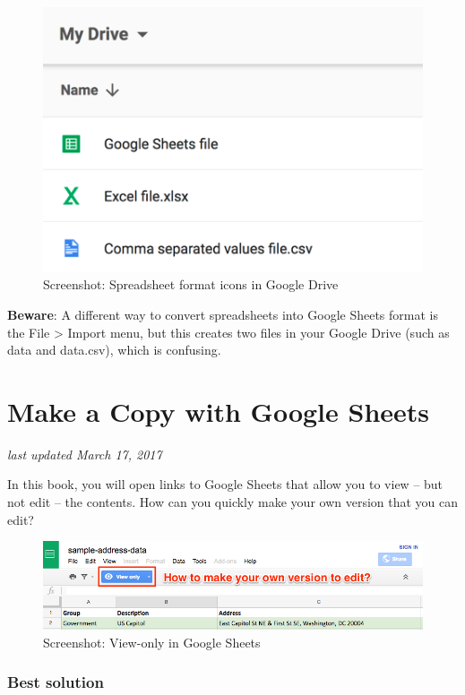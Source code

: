 \documentclass[
  english,
]{book}
\begin{document}
\begin{figure}
\centering
\includegraphics{images/02-spreadsheet/google-drive-spreadsheet-icons.png}
\caption{Screenshot: Spreadsheet format icons in Google Drive}
\end{figure}

\textbf{Beware}: A different way to convert spreadsheets into Google Sheets format is the File \textgreater{} Import menu, but this creates two files in your Google Drive (such as data and data.csv), which is confusing.

\hypertarget{copy}{%
\section{Make a Copy with Google Sheets}\label{copy}}

\emph{last updated March 17, 2017}

In this book, you will open links to Google Sheets that allow you to view -- but not edit -- the contents. How can you quickly make your own version that you can edit?

\begin{figure}
\centering
\includegraphics{images/02-spreadsheet/google-sheets-copy1.png}
\caption{Screenshot: View-only in Google Sheets}
\end{figure}

\hypertarget{best-solution}{%
\subsubsection*{Best solution}\label{best-solution}}
\end{document}
